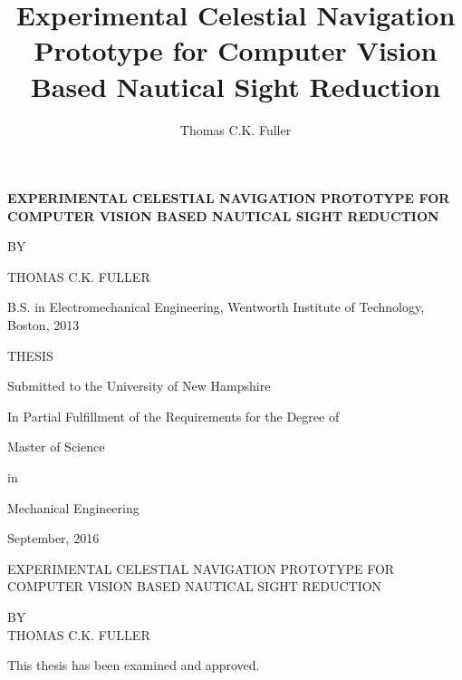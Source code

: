 \documentclass[12pt,a4paper]{book}
\author{Thomas C.K. Fuller}
\title{Experimental Celestial Navigation Prototype for Computer Vision Based Nautical Sight Reduction}
\begin{document}
\frontmatter
\begin{titlepage}
	\centering
	{\scshape\large \textbf{EXPERIMENTAL CELESTIAL NAVIGATION PROTOTYPE FOR COMPUTER VISION BASED NAUTICAL SIGHT REDUCTION}\par}
	\vspace{1.75cm}
	{\scshape\normalsize BY\par}
	\vspace{2.25cm}
	{\normalsize THOMAS C.K. FULLER\par}
	{\normalsize B.S. in Electromechanical Engineering, Wentworth Institute of Technology, Boston, 2013\par}
	
	\vspace{2cm}
	{\normalsize THESIS\par}
	\vspace{2.5cm}
	{\normalsize Submitted to the University of New Hampshire\par}
	{\normalsize In Partial Fulfillment of the Requirements for the Degree of\par}
	{\normalsize Master of Science\par}
	{\normalsize in\par}
	{\normalsize Mechanical Engineering\par}


	\vfill

	{\normalsize September, 2016\par}
\end{titlepage}
\begin{center}
EXPERIMENTAL CELESTIAL NAVIGATION PROTOTYPE FOR COMPUTER VISION BASED NAUTICAL SIGHT REDUCTION

\vspace{1cm}
{\normalsize BY}\\
{\normalsize THOMAS C.K. FULLER}
\end{center}
\vspace{2cm}
This thesis has been examined and approved.
\vspace{2cm}
\\
\hspace*{3cm}
\end{document}
